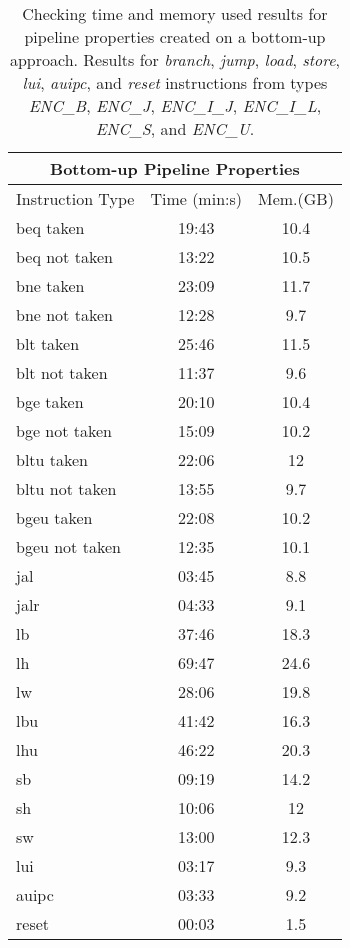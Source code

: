 \begin{table*}[htb!] 
	\centering 
	\caption{Checking time and memory used results for pipeline properties created on a bottom-up approach. Results for \textit{branch}, \textit{jump}, \textit{load}, \textit{store}, \textit{lui}, \textit{auipc}, and \textit{reset} instructions from types \textit{ENC\_B}, \textit{ENC\_J}, \textit{ENC\_I\_J}, \textit{ENC\_I\_L}, \textit{ENC\_S}, and \textit{ENC\_U}.} 
	\label{tab:bottom-up-check-resutls-others}
		\begin{tabular}{p{4cm}cc}
          \multicolumn{3}{c}{\textbf{Bottom-up Pipeline Properties}} \\
          \hline
         Instruction Type & Time (min:s) & Mem.(GB)  \\
          \hline
        beq taken    & 19:43 & 10.4 \\
        beq not taken     & 13:22 & 10.5 \\
        bne taken    & 23:09 & 11.7 \\
        bne not taken    & 12:28 & 9.7 \\
        blt taken    & 25:46 & 11.5 \\
        blt not taken    & 11:37 & 9.6 \\
        bge taken    & 20:10 & 10.4 \\
        bge not taken    & 15:09 & 10.2 \\
        bltu taken    & 22:06 & 12 \\
        bltu not taken    & 13:55 & 9.7 \\
        bgeu taken    & 22:08 & 10.2 \\
        bgeu not taken    & 12:35 & 10.1 \\
        jal    & 03:45 & 8.8 \\
        jalr    & 04:33 & 9.1 \\
        lb    & 37:46 & 18.3 \\
        lh    & 69:47 & 24.6 \\
        lw    & 28:06 & 19.8 \\
        lbu    & 41:42 & 16.3 \\
        lhu    & 46:22 & 20.3 \\
        sb    & 09:19 & 14.2 \\
        sh    & 10:06 & 12 \\
        sw    & 13:00 & 12.3 \\
        lui    & 03:17 & 9.3 \\
        auipc    & 03:33 & 9.2 \\
        reset    & 00:03 & 1.5 \\
\end{tabular}
\end{table*}